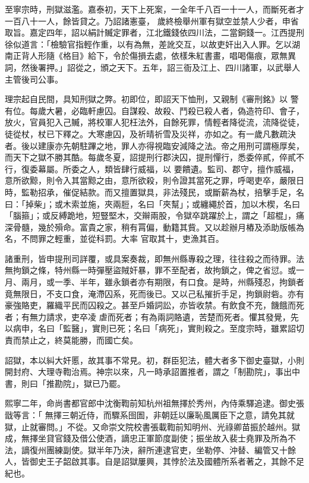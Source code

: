 \begin{pinyinscope}
 至寧宗時，刑獄滋濫。嘉泰初，天下上死案，一全年千八百一十一人，而斷死者才一百八十一人，餘皆貸之。乃詔諸憲臺，
 歲終檢舉州軍有獄空並禁人少者，申省取旨。嘉定四年，詔以絹計贓定罪者，江北鐵錢依四川法，二當銅錢一。江西提刑徐似道言：「檢驗官指輕作重，以有為無，差訛交互，以故吏奸出入人罪。乞以湖南正背人形隨《格目》給下，令於傷損去處，依樣朱紅書畫，唱喝傷痕，眾無異詞，然後署押。」詔從之，頒之天下。五年，詔三衙及江上、四川諸軍，以武舉人主管後司公事。



 理宗起自民間，具知刑獄之弊。初即位，即詔天下恤刑，又親制《審刑銘》以
 警有位。每歲大暑，必臨軒慮囚。自謀殺、故殺、鬥殺已殺人者，偽造符印、會子，放火，官員犯入己贓，將校軍人犯枉法外，自餘死罪，情輕者降從流，流降從徒，徒從杖，杖已下釋之。大寒慮囚，及祈晴祈雪及災祥，亦如之。有一歲凡數疏決者。後以建康亦先朝駐蹕之地，罪人亦得視臨安減降之法。帝之用刑可謂極厚矣，而天下之獄不勝其酷。每歲冬夏，詔提刑行郡決囚，提刑憚行，悉委倅貳，倅貳不行，復委幕屬。所委之人，類皆肆行威福，以
 要饋遺。監司、郡守，擅作威福，意所欲黥，則令入其當黥之由，意所欲殺，則令證其當死之罪，呼喝吏卒，嚴限日時，監勒招承，催促結款。而又擅置獄具，非法殘民，或斷薪為杖，掊擊手足，名曰：「掉柴」；或木索並施，夾兩脰，名曰「夾幫」；或纏繩於首，加以木楔，名曰「腦箍」；或反縛跪地，短豎堅木，交辮兩股，令獄卒跳躍於上，謂之「超棍」，痛深骨髓，幾於殞命。富貴之家，稍有罥偏，動籍其貲。又以趁辦月樁及添助版帳為名，不問罪之輕重，並從科罰。大率
 官取其十，吏漁其百。



 諸重刑，皆申提刑司詳覆，或具案奏裁，即無州縣專殺之理，往往殺之而待罪。法無拘鎖之條，特州縣一時彈壓盜賊奸暴，罪不至配者，故拘鎖之，俾之省愆。或一月、兩月，或一季、半年，雖永鎖者亦有期限，有口食。是時，州縣殘忍，拘鎖者竟無限日，不支口食，淹滯囚系，死而後已。又以己私摧折手足，拘鎖尉砦。亦有豪強賂吏，羅織平民而囚殺之。甚至戶婚詞訟，亦皆收禁。有飲食不充，饑餓而死者；有無力請求，吏卒凌
 虐而死者；有為兩詞賂遺，苦楚而死者。懼其發覺，先以病申，名曰「監醫」，實則已死；名曰「病死」，實則殺之。至度宗時，雖累詔切責而禁止之，終莫能勝，而國亡矣。



 詔獄，本以糾大奸慝，故其事不常見。初，群臣犯法，體大者多下御史臺獄，小則開封府、大理寺鞫治焉。神宗以來，凡一時承詔置推者，謂之「制勘院」，事出中書，則曰「推勘院」，獄已乃罷。



 熙寧二年，命尚書都官郎中沈衡鞫前知杭州祖無擇於秀州，內侍乘驛追逮。御史張戩等言：「
 無擇三朝近侍，而驟系囹圄，非朝廷以廉恥風厲臣下之意，請免其就獄，止就審問。」不從。又命崇文院校書張載鞫前知明州、光祿卿苗振於越州。獄成，無擇坐貸官錢及借公使酒，謫忠正軍節度副使；振坐故入裴士堯罪及所為不法，謫復州團練副使。獄半年乃決，辭所連逮官吏，坐勒停、沖替、編管又十餘人，皆御史王子韶啟其事。自是詔獄屢興，其悖於法及國體所系者著之，其餘不足紀也。




\end{pinyinscope}

